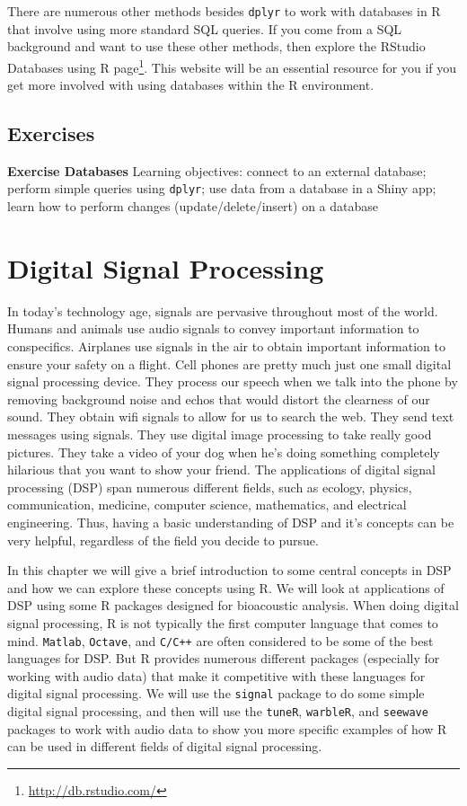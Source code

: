 \documentclass[
]{krantz}
\renewcommand{\href}[2]{#2\footnote{\url{#1}}}
\begin{document}
There are numerous other methods besides \texttt{dplyr} to work with databases in R that involve using more standard SQL queries. If you come from a SQL background and want to use these other methods, then explore the \href{http://db.rstudio.com/}{RStudio Databases using R page}. This website will be an essential resource for you if you get more involved with using databases within the R environment.

\hypertarget{exDatabases}{%
\section{Exercises}\label{exDatabases}}

\textbf{Exercise Databases} Learning objectives: connect to an external database; perform simple queries using \texttt{dplyr}; use data from a database in a Shiny app; learn how to perform changes (update/delete/insert) on a database

\hypertarget{digital-signal-processing}{%
\chapter{Digital Signal Processing}\label{digital-signal-processing}}

In today's technology age, signals are pervasive throughout most of the world. Humans and animals use audio signals to convey important information to conspecifics. Airplanes use signals in the air to obtain important information to ensure your safety on a flight. Cell phones are pretty much just one small digital signal processing device. They process our speech when we talk into the phone by removing background noise and echos that would distort the clearness of our sound. They obtain wifi signals to allow for us to search the web. They send text messages using signals. They use digital image processing to take really good pictures. They take a video of your dog when he's doing something completely hilarious that you want to show your friend. The applications of digital signal processing (DSP) span numerous different fields, such as ecology, physics, communication, medicine, computer science, mathematics, and electrical engineering. Thus, having a basic understanding of DSP and it's concepts can be very helpful, regardless of the field you decide to pursue.

In this chapter we will give a brief introduction to some central concepts in DSP and how we can explore these concepts using R. We will look at applications of DSP using some R packages designed for bioacoustic analysis. When doing digital signal processing, R is not typically the first computer language that comes to mind. \texttt{Matlab}, \texttt{Octave}, and \texttt{C/C++} are often considered to be some of the best languages for DSP. But R provides numerous different packages (especially for working with audio data) that make it competitive with these languages for digital signal processing. We will use the \texttt{signal} package to do some simple digital signal processing, and then will use the \texttt{tuneR}, \texttt{warbleR}, and \texttt{seewave} packages to work with audio data to show you more specific examples of how R can be used in different fields of digital signal processing.
\end{document}
